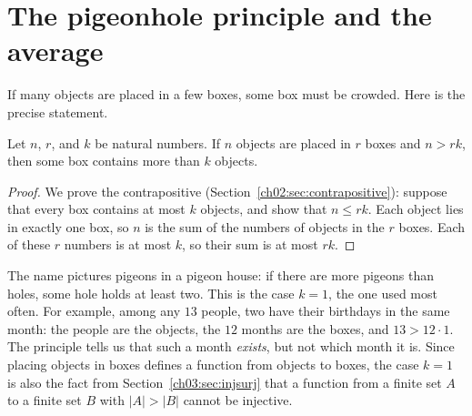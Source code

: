 \section{The pigeonhole principle and the average}\label{ch07:sec:pigeonhole}
If many objects are placed in a few boxes, some box must be crowded. Here is the precise statement.

\par\noindent\begin{minipage}{\linewidth}
\begin{proposition}\label{ch07:prop:pigeonhole}
Let $n$, $r$, and $k$ be natural numbers. If $n$ objects are placed in $r$ boxes and $n>rk$, then some box contains more than $k$ objects.
\end{proposition}
\end{minipage}\par

\begin{proof}
We prove the contrapositive (Section~\ref{ch02:sec:contrapositive}): suppose that every box contains at most $k$ objects, and show that $n\le rk$. Each object lies in exactly one box, so $n$ is the sum of the numbers of objects in the $r$ boxes. Each of these $r$ numbers is at most $k$, so their sum is at most $rk$.
\end{proof}

The name pictures pigeons in a pigeon house: if there are more pigeons than holes, some hole holds at least two. This is the case $k=1$, the one used most often. For example, among any $13$ people, two have their birthdays in the same month: the people are the objects, the $12$ months are the boxes, and $13>12\cdot1$. The principle tells us that such a month \emph{exists}, but not which month it is. Since placing objects in boxes defines a function from objects to boxes, the case $k=1$ is also the fact from Section~\ref{ch03:sec:injsurj} that a function from a finite set $A$ to a finite set $B$ with $|A|>|B|$ cannot be injective.


